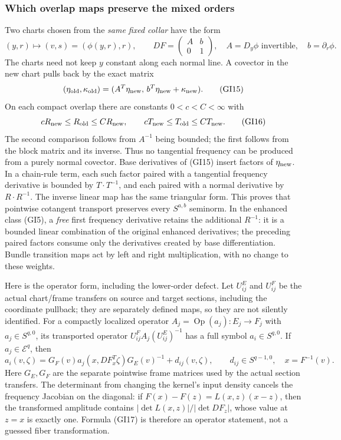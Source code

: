 \documentclass[
  11pt,
]{article}
\begin{document}
\subsubsection{Which overlap maps preserve the mixed
orders}\label{which-overlap-maps-preserve-the-mixed-orders}

Two charts chosen from the \emph{same fixed collar} have the form \[
 (y,r)\longmapsto(v,s)=(\phi(y,r),r),\qquad
 DF=\begin{pmatrix}A&b\\0&1\end{pmatrix},
 \quad A=D_y\phi\text{ invertible},\quad b=\partial_r\phi.
 \tag{GI14}
\] The charts need not keep \(y\) constant along each normal line. A
covector in the new chart pulls back by the exact matrix \[
 (\eta_{\rm old},\kappa_{\rm old})
 =(A^T\eta_{\rm new},\,b^T\eta_{\rm new}+\kappa_{\rm new}).
 \tag{GI15}
\] On each compact overlap there are constants \(0<c<C<\infty\) with \[
 cR_{\rm new}\leq R_{\rm old}\leq CR_{\rm new},\qquad
 cT_{\rm new}\leq T_{\rm old}\leq CT_{\rm new}.
 \tag{GI16}
\] The second comparison follows from \(A^{-1}\) being bounded; the
first follows from the block matrix and its inverse. Thus no tangential
frequency can be produced from a purely normal covector. Base
derivatives of (GI15) insert factors of \(\eta_{\rm new}\). In a
chain-rule term, each such factor paired with a tangential frequency
derivative is bounded by \(T\cdot T^{-1}\), and each paired with a
normal derivative by \(R\cdot R^{-1}\). The inverse linear map has the
same triangular form. This proves that pointwise cotangent transport
preserves every \(S^{a,b}\) seminorm. In the enhanced class (GI5), a
\emph{free} first frequency derivative retains the additional
\(R^{-1}\): it is a bounded linear combination of the original enhanced
derivatives; the preceding paired factors consume only the derivatives
created by base differentiation. Bundle transition maps act by left and
right multiplication, with no change to these weights.

Here is the operator form, including the lower-order defect. Let
\(U^E_{ij}\) and \(U^F_{ij}\) be the actual chart/frame transfers on
source and target sections, including the coordinate pullback; they are
separately defined maps, so they are not silently identified. For a
compactly localized operator \(A_j=\operatorname{Op}(a_j):E_j\to F_j\)
with \(a_j\in S^{q,0}\), its transported operator
\(U^F_{ij}A_j(U^E_{ij})^{-1}\) has a full symbol \(a_i\in S^{q,0}\). If
\(a_j\in\mathscr E^q\), then \[
 a_i(v,\zeta)=G_F(v)a_j(x,DF_x^T\zeta)G_E(v)^{-1}
                      +d_{ij}(v,\zeta),
 \qquad d_{ij}\in S^{q-1,0},\quad x=F^{-1}(v).
 \tag{GI17}
\] Here \(G_E,G_F\) are the separate pointwise frame matrices used by
the actual section transfers. The determinant from changing the kernel's
input density cancels the frequency Jacobian on the diagonal: if
\(F(x)-F(z)=L(x,z)(x-z)\), then the transformed amplitude contains
\( |\det L(x,z)|/|\det DF_z|\), whose value at \(z=x\) is exactly one.
Formula (GI17) is therefore an operator statement, not a guessed fiber
transformation.
\end{document}
